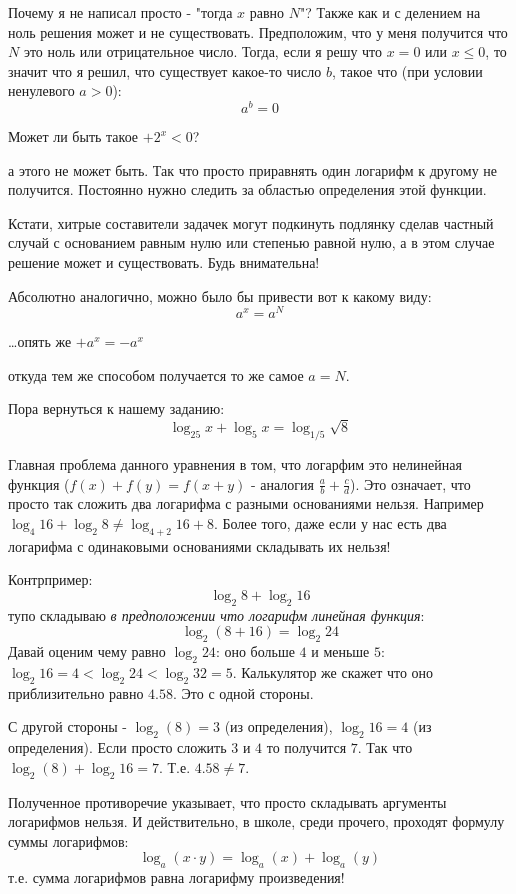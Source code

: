 \documentclass{article}
\begin{document}
Почему я не написал просто - "тогда $x$ равно $N$"? Также как и с делением на ноль решения может и не существовать. Предположим, что у меня получится что $N$ это ноль или отрицательное число. Тогда, если я решу что $x=0$ или $x\le{}0$, то значит что я решил, что существует какое-то число $b$, такое что (при условии ненулевого $a>0$):
$$a^b=0$$

Может ли быть такое $+2^x<0$?

а этого не может быть. Так что просто приравнять один логарифм к другому не получится. Постоянно нужно следить за областью определения этой функции.

Кстати, хитрые составители задачек могут подкинуть подлянку сделав частный случай с основанием равным нулю или степенью равной нулю, а в этом случае решение может и существовать. Будь внимательна!

Абсолютно аналогично, можно было бы привести вот к какому виду:
$$a^x=a^N$$

\ldots{}опять же $+a^x=-a^x$

откуда тем же способом получается то же самое $a=N$.

Пора вернуться к нашему заданию:
$$\log_{25}{x}+\log_{5}{x}=\log_{1/5}{\sqrt{8}}$$

Главная проблема данного уравнения в том, что логарфим это нелинейная функция ($f(x)+f(y)=f(x+y)$ - аналогия $\frac{a}{b}+\frac{c}{d}$). Это означает, что просто так сложить два логарифма с разными основаниями нельзя. Например $\log_{4}{16}+\log_{2}{8} \ne \log_{4+2}{16+8}$. Более того, даже если у нас есть два логарифма с одинаковыми основаниями складывать их нельзя!

Контрпример:
$$\log_{2}{8} + \log_{2}{16}$$
тупо складываю \textit{в предположении что логарифм линейная функция}:
$$\log_{2}{(8+16)} = \log_{2}{24}$$
Давай оценим чему равно $\log_{2}{24}$: оно больше $4$ и меньше $5$: $\log_{2}{16}=4 < \log_{2}{24} < \log_{2}{32}=5$. Калькулятор же скажет что оно приблизительно равно $4.58$. Это с одной стороны.

С другой стороны - $\log_{2}(8)=3$ (из определения), $\log_{2}{16}=4$ (из определения). Если просто сложить $3$ и $4$ то получится $7$. Так что $\log_{2}(8)+\log_{2}{16} = 7$. Т.е. $4.58 \ne 7$.

Полученное противоречие указывает, что просто складывать аргументы логарифмов нельзя. И действительно, в школе, среди прочего, проходят формулу суммы логарифмов:
$$\log_{a}{(x\cdot{}y)} = \log_{a}{(x)} + \log_{a}{(y)}$$
т.е. сумма логарифмов равна логарифму произведения!
\end{document}
